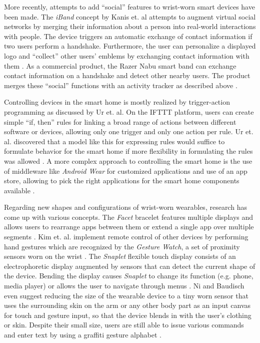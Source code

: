 More recently, attempts to add ``social'' features to wrist-worn smart devices have been made. The \textit{iBand} concept by Kanis et. al attempts to augment virtual social networks by merging their information about a person into real-world interactions with people. The device  triggers an automatic exchange of contact information if two users perform a handshake. Furthermore, the user can personalize a displayed logo and ``collect'' other users' emblems by exchanging contact information with them \cite{Kanis2005}. As a commercial product, the Razer Nabu smart band can exchange contact information on a handshake and detect other nearby users. The product merges these ``social'' functions with an activity tracker as described above \cite{razernabu}.

Controlling devices in the smart home is mostly realized by trigger-action programming as discussed by Ur et. al. On the IFTTT platform, users can create simple ``if, then'' rules for linking a broad range of actions between different software or devices, allowing only one trigger and only one action per rule. Ur et. al. discovered that a model like this for expressing rules would suffice to formulate behavior for the smart home if more flexibility in formulating the rules was allowed \cite{Ur2014}. A more complex approach to controlling the smart home is the use of middleware like \textit{Android Wear} for customized applications and use of an app store, allowing to pick the right applications for the smart home components available \cite{androidwear}.

Regarding new shapes and configurations of wrist-worn wearables, research has come up with various concepts. The \textit{Facet} bracelet features multiple displays and allows users to rearrange apps between them or extend a single app over multiple segments \cite{Lyons2012}. Kim et. al. implement remote control of other devices by performing hand gestures which are recognized by the \textit{Gesture Watch}, a set of proximity sensors worn on the wrist \cite{Kim2007}. The \textit{Snaplet} flexible touch display consists of an electrophoretic display augmented by sensors that can detect the current shape of the device. Bending the display causes \textit{Snaplet} to change its function (e.g. phone, media player) or allows the user to navigate through menus \cite{Tarun2011}. Ni and Baudisch even suggest reducing the size of the wearable device to a tiny worn sensor that uses the surrounding skin on the arm or any other body part as an input canvas for touch and gesture input, so that the device blends in with the user's clothing or skin. Despite their small size, users are still able to issue various commands and enter text by using a graffiti gesture alphabet \cite{Ni2009}.

